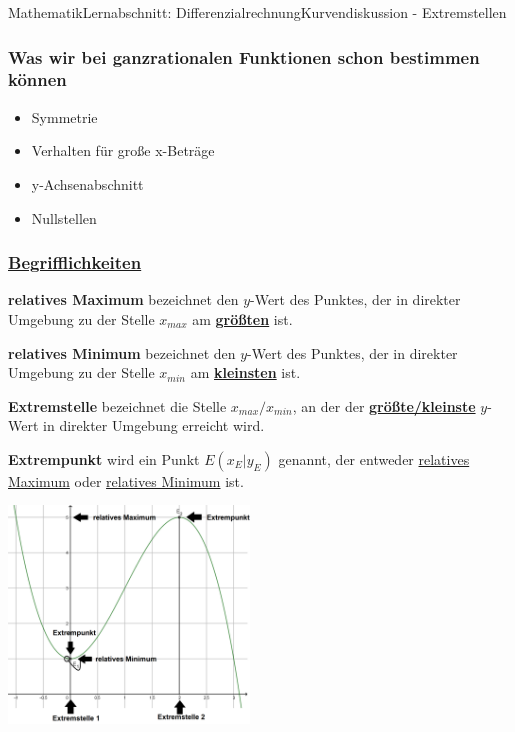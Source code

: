 \documentclass[11pt,twocolumn,oneside,openany,headings=optiontotoc,11pt,numbers=noenddot]{article}
\begin{document}
	\begin{worksheet}{Mathematik}{Lernabschnitt: Differenzialrechnung}{Kurvendiskussion - Extremstellen}
		\subsubsection*{Was wir bei ganzrationalen Funktionen schon bestimmen können}
		\begin{itemize}[label=-]
			\item Symmetrie
			\item Verhalten für große x-Beträge
			\item y-Achsenabschnitt
			\item Nullstellen
		\end{itemize}
		\subsubsection*{\underline{Begrifflichkeiten}}
		\textbf{relatives Maximum} bezeichnet den \(y\)-Wert des Punktes, der in direkter Umgebung zu der Stelle \(x_{max}\) am \textbf{\underline{größten}} ist.\\
		\par\noindent
		\textbf{relatives Minimum} bezeichnet den \(y\)-Wert des Punktes, der in direkter Umgebung zu der Stelle \(x_{min}\) am \underline{\textbf{kleinsten}} ist.\\
		\par\noindent
		\textbf{Extremstelle} bezeichnet die Stelle \(x_{max}/x_{min}\), an der der \textbf{\underline{größte/kleinste}} \(y\)-Wert in direkter Umgebung erreicht wird.\\
		\par\noindent
		\textbf{Extrempunkt} wird ein Punkt \(E(x_E|y_E)\) genannt, der entweder \underline{relatives Maximum} oder \underline{relatives Minimum} ist.\\
		\par\noindent
		\includegraphics[width=0.48\textwidth]{../99_Bilder/042_Beg.png}
		\setcounter{section}{7}
		\setcounter{subsection}{3}

\end{worksheet}
\end{document}
